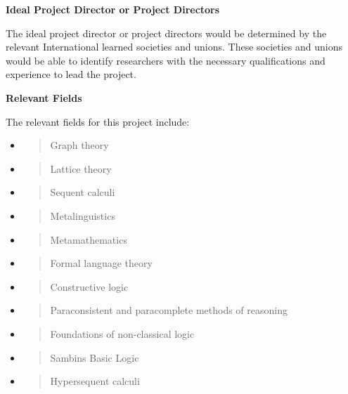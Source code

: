\textbf{Ideal Project Director or Project Directors}

The ideal project director or project directors would be determined by
the relevant International learned societies and unions. These societies
and unions would be able to identify researchers with the necessary
qualifications and experience to lead the project.

\textbf{Relevant Fields}

The relevant fields for this project include:

\begin{itemize}
\item
  \begin{quote}
  Graph theory
  \end{quote}
\item
  \begin{quote}
  Lattice theory
  \end{quote}
\item
  \begin{quote}
  Sequent calculi
  \end{quote}
\item
  \begin{quote}
  Metalinguistics
  \end{quote}
\item
  \begin{quote}
  Metamathematics
  \end{quote}
\item
  \begin{quote}
  Formal language theory
  \end{quote}
\item
  \begin{quote}
  Constructive logic
  \end{quote}
\item
  \begin{quote}
  Paraconsistent and paracomplete methods of reasoning
  \end{quote}
\item
  \begin{quote}
  Foundations of non-classical logic
  \end{quote}
\item
  \begin{quote}
  Sambin\textquotesingle s Basic Logic
  \end{quote}
\item
  \begin{quote}
  Hypersequent calculi
  \end{quote}

\end{itemize}
